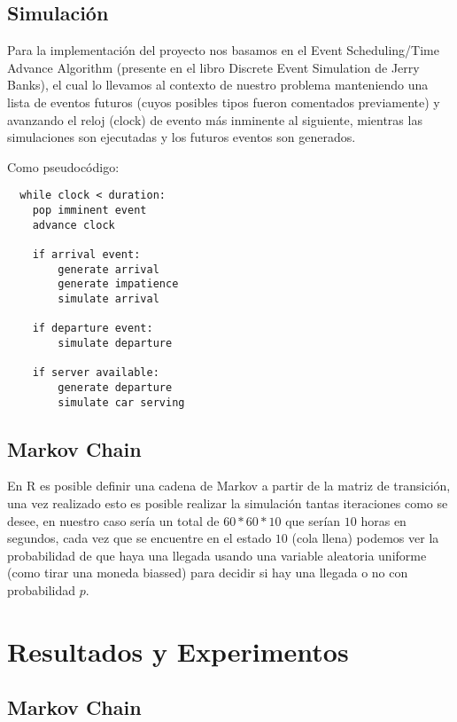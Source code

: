 \documentclass[14pt]{extarticle}
\begin{document}
\subsection{Simulación}

Para la implementación del proyecto nos basamos en el Event Scheduling/Time Advance Algorithm (presente en el libro Discrete Event Simulation de Jerry Banks), el cual lo llevamos al contexto de nuestro problema manteniendo una lista de eventos futuros (cuyos posibles tipos fueron comentados previamente) y avanzando el reloj (clock) de evento más inminente al siguiente, mientras las simulaciones son ejecutadas y los futuros eventos son generados.

Como pseudocódigo:

\begin{verbatim}
  while clock < duration:
    pop imminent event
    advance clock

    if arrival event:
        generate arrival
        generate impatience
        simulate arrival
    
    if departure event:
        simulate departure

    if server available:
        generate departure
        simulate car serving  
\end{verbatim}

\subsection{Markov Chain}

En R es posible definir una cadena de Markov a partir de la matriz de transición, una vez realizado esto es posible realizar la simulación tantas iteraciones como se desee, en nuestro caso sería un total de $60 * 60 * 10$ que serían $10$ horas en segundos, cada vez que se encuentre en el estado $10$ (cola llena) podemos ver la probabilidad de que haya una llegada usando una variable aleatoria uniforme (como tirar una moneda biassed) para decidir si hay una llegada o no con probabilidad $p$.

\section{Resultados y Experimentos}

\subsection{Markov Chain}
\end{document}
